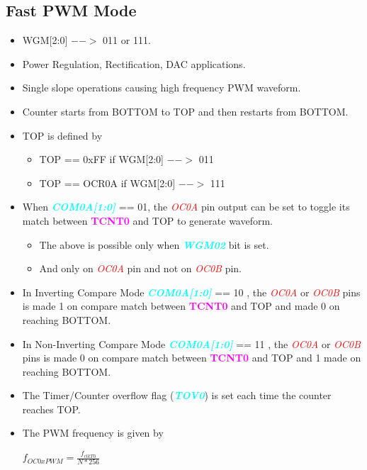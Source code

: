 \documentclass{article}
\newcommand{\bitFormat}[1]{\emph{\textbf{\textcolor{cyan}{#1}}}}
\newcommand{\regFormat}[1]{\textbf{\textcolor{magenta}{#1}}}
\newcommand{\pinFormat}[1]{\emph{\textcolor{red}{#1}}}
\begin{document}
\subsection{Fast PWM Mode}
\begin{itemize}
    \item WGM[2:0] $-->$ 011 or 111.
    \item Power Regulation, Rectification, DAC applications.
    \item Single slope operations causing high frequency PWM waveform.
    \item Counter starts from BOTTOM to TOP and then restarts from BOTTOM.
    \item TOP is defined by
    \begin{itemize}
        \item TOP == 0xFF if WGM[2:0] $-->$ 011
        \item TOP == OCR0A if WGM[2:0] $-->$ 111
    \end{itemize}
    \item  When \bitFormat{COM0A[1:0]} == 01, the \pinFormat{OC0A} pin output can be set to toggle its match between \regFormat{TCNT0} and TOP to generate waveform.
    \begin{itemize}
        \item The above is possible only when \bitFormat{WGM02} bit is set.
        \item And only on \pinFormat{OC0A} pin and not on \pinFormat{OC0B} pin.
    \end{itemize}
    \item In Inverting Compare Mode \bitFormat{COM0A[1:0]} == 10 , the \pinFormat{OC0A} or \pinFormat{OC0B} pins is made 1 on compare match between \regFormat{TCNT0} and TOP and made 0 on reaching BOTTOM.
    \item In Non-Inverting Compare Mode \bitFormat{COM0A[1:0]} == 11 , the \pinFormat{OC0A} or \pinFormat{OC0B} pins is made 0 on compare match between \regFormat{TCNT0} and TOP and 1 made  on reaching BOTTOM.
    \item The Timer/Counter overflow flag (\bitFormat{TOV0}) is set each time the counter reaches TOP.
    \item The PWM frequency is given by 
    \begin{center}
        { \Large $f_{OC0xPWM} = \frac{f_{clkT0}}{N * 256}$ }
    \end{center}
\end{itemize}
\end{document}

